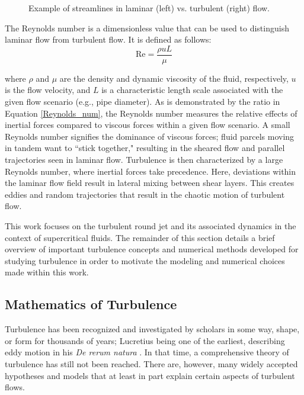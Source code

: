 \begin{figure}[h!]
\begin{center}
\end{center}
\caption{Example of streamlines in laminar (left) vs. turbulent (right) flow.}
\label{lam_vs_turb}
\end{figure}

The Reynolds number is a dimensionless value that can be used to distinguish laminar flow from turbulent flow. It is defined as follows:
\begin{equation}
\label{Reynolds_num}
\text{Re} = \frac{\rho u L}{\mu}
\end{equation}

\noindent where $\rho$ and $\mu$ are the density and dynamic viscosity of the fluid, respectively, $u$ is the flow velocity, and $L$ is a characteristic length scale associated with the given flow scenario (e.g., pipe diameter). As is demonstrated by the ratio in Equation \ref{Reynolds_num}, the Reynolds number measures the relative effects of inertial forces compared to viscous forces within a given flow scenario. A small Reynolds number signifies the dominance of viscous forces; fluid parcels moving in tandem want to ``stick together," resulting in the sheared flow and parallel trajectories seen in laminar flow. Turbulence is then characterized by a large Reynolds number, where inertial forces take precedence. Here, deviations within the laminar flow field result in lateral mixing between shear layers. This creates eddies and random trajectories that result in the chaotic motion of turbulent flow. 

This work focuses on the turbulent round jet and its associated dynamics in the context of supercritical fluids. The remainder of this section details a brief overview of important turbulence concepts and numerical methods developed for studying turbulence in order to motivate the modeling and numerical choices made within this work.

\subsection{Mathematics of Turbulence}
Turbulence has been recognized and investigated by scholars in some way, shape, or form for thousands of years; Lucretius being one of the earliest, describing eddy motion in his \textit{De rerum natura} \cite{Benzi:2010}. In that time, a comprehensive theory of turbulence has still not been reached. There are, however, many widely accepted hypotheses and models that at least in part explain certain aspects of turbulent flows.  


